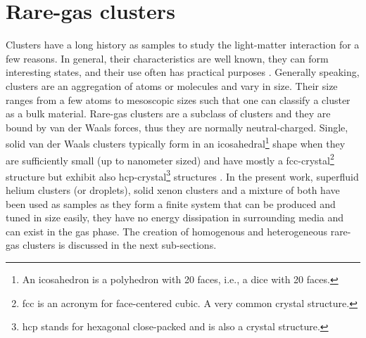 \section{Rare-gas clusters}\label{sec:cluster-theory}
Clusters have a long history as samples to study the light-matter interaction for a few reasons. In general, their characteristics are well known, they can form interesting states, and their use often has practical purposes \citep{Haberland-1994-Springer}. Generally speaking, clusters are an aggregation of atoms or molecules and vary in size. Their size ranges from a few atoms to mesoscopic sizes such that one can classify a cluster as a bulk material. Rare-gas clusters are a subclass of clusters and they are bound by van der Waals forces, thus they are normally neutral-charged. Single, solid van der Waals clusters typically form in an icosahedral\footnote{An icosahedron is a polyhedron with 20 faces, i.e., a dice with 20 faces.} shape when they are sufficiently small (up to nanometer sized) \citep{Miehle-1989-JCP} and have mostly a fcc-crystal\footnote{fcc is an acronym for face-centered cubic. A very common crystal structure.} structure but exhibit also hcp-crystal\footnote{hcp stands for hexagonal close-packed and is also a crystal structure.} structures \citep{VanDeWaal-1993-JCP,Krainyukova-2006-TSF}. In the present work, superfluid helium clusters (or droplets), solid xenon clusters and a mixture of both have been used as samples as they form a finite system that can be produced and tuned in size easily, they have no energy dissipation in surrounding media and can exist in the gas phase. The creation of homogenous and heterogeneous rare-gas clusters is discussed in the next sub-sections.
%
%
%
